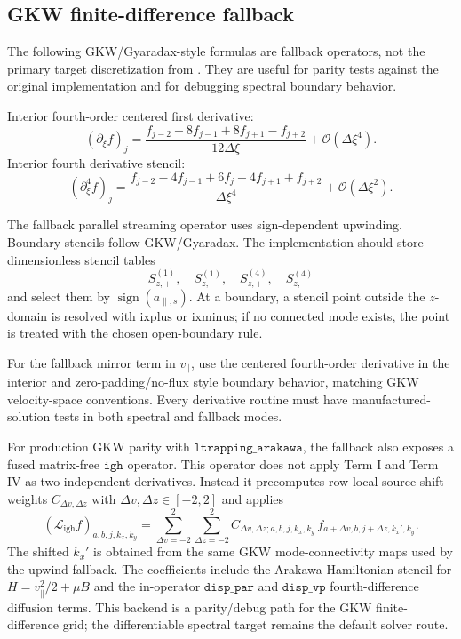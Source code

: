 \documentclass[11pt,a4paper]{article}
\begin{document}
\subsection{GKW finite-difference fallback}

The following GKW/Gyaradax-style formulas are fallback operators, not the primary target discretization from .  They are useful for parity tests against the original implementation and for debugging spectral boundary behavior.

Interior fourth-order centered first derivative:
\begin{equation}
  (\partial_\xi f)_j
  =
  \frac{
    f_{j-2}-8f_{j-1}+8f_{j+1}-f_{j+2}
  }{12\Delta \xi}
  +\mathcal{O}(\Delta\xi^4).
  \label{eq:d1-centered}
\end{equation}
Interior fourth derivative stencil:
\begin{equation}
  (\partial_\xi^4 f)_j
  =
  \frac{
    f_{j-2}-4f_{j-1}+6f_j-4f_{j+1}+f_{j+2}
  }{\Delta\xi^4}
  +\mathcal{O}(\Delta\xi^2).
  \label{eq:d4-centered}
\end{equation}

The fallback parallel streaming operator uses sign-dependent upwinding.  Boundary stencils follow GKW/Gyaradax.  The implementation should store dimensionless stencil tables
\begin{equation}
  S_{z,+}^{(1)},\quad S_{z,-}^{(1)},\quad
  S_{z,+}^{(4)},\quad S_{z,-}^{(4)}
  \label{eq:stencil-tables}
\end{equation}
and select them by \(\operatorname{sign}(a_{\parallel,s})\).  At a boundary, a stencil point outside the \(z\)-domain is resolved with \(\mathrm{ixplus}\) or \(\mathrm{ixminus}\); if no connected mode exists, the point is treated with the chosen open-boundary rule.

For the fallback mirror term in \(v_\parallel\), use the centered fourth-order derivative in the interior and zero-padding/no-flux style boundary behavior, matching GKW velocity-space conventions.  Every derivative routine must have manufactured-solution tests in both spectral and fallback modes.

For production GKW parity with \(\texttt{ltrapping\_arakawa}\), the fallback
also exposes a fused matrix-free \(\texttt{igh}\) operator.  This operator does
not apply Term I and Term IV as two independent derivatives.  Instead it
precomputes row-local source-shift weights \(C_{\Delta v,\Delta z}\) with
\(\Delta v,\Delta z\in[-2,2]\) and applies
\begin{equation}
  \left(\mathcal{L}_{\mathrm{igh}} f\right)_{a,b,j,k_x,k_y}
  =
  \sum_{\Delta v=-2}^{2}
  \sum_{\Delta z=-2}^{2}
  C_{\Delta v,\Delta z;a,b,j,k_x,k_y}\,
  f_{a+\Delta v,b,j+\Delta z,k_x',k_y}.
  \label{eq:gkw-igh-backend}
\end{equation}
The shifted \(k_x'\) is obtained from the same GKW mode-connectivity maps used
by the upwind fallback.  The coefficients include the Arakawa Hamiltonian
stencil for \(H=v_\parallel^2/2+\mu B\) and the in-operator
\(\texttt{disp\_par}\) and \(\texttt{disp\_vp}\) fourth-difference diffusion
terms.  This backend is a parity/debug path for the GKW finite-difference
grid; the differentiable spectral target remains the default solver route.
\end{document}
